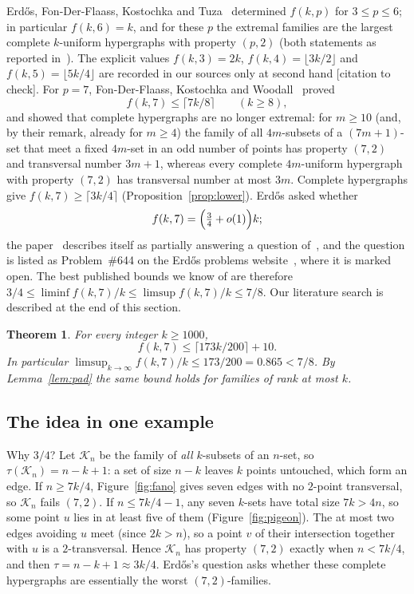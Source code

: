 \documentclass[11pt]{amsart}
\newtheorem{theorem}{Theorem}[section]
\theoremstyle{definition}
\theoremstyle{remark}
\newcommand{\ceil}[1]{\lceil #1\rceil}
\newcommand{\floor}[1]{\lfloor #1\rfloor}
\begin{document}
Erd\H{o}s, Fon-Der-Flaass, Kostochka and Tuza~\cite{EFKT} determined $f(k,p)$ for $3\le p\le6$; in particular $f(k,6)=k$, and for these $p$ the extremal families are the largest complete $k$-uniform hypergraphs with property $(p,2)$ (both statements as reported in~\cite{FKW}). The explicit values $f(k,3)=2k$, $f(k,4)=\floor{3k/2}$ and $f(k,5)=\floor{5k/4}$ are recorded in our sources only at second hand [citation to check]. For $p=7$, Fon-Der-Flaass, Kostochka and Woodall~\cite{FKW} proved
\[
f(k,7)\le\ceil{7k/8}\qquad(k\ge8),
\]
and showed that complete hypergraphs are no longer extremal: for $m\ge10$ (and, by their remark, already for $m\ge4$) the family of all $4m$-subsets of a $(7m+1)$-set that meet a fixed $4m$-set in an odd number of points has property $(7,2)$ and transversal number $3m+1$, whereas every complete $4m$-uniform hypergraph with property $(7,2)$ has transversal number at most $3m$. Complete hypergraphs give $f(k,7)\ge\ceil{3k/4}$ (Proposition~\ref{prop:lower}). Erd\H{o}s asked whether
\[
f(k,7)=\Bigl(\tfrac34+o(1)\Bigr)k ;
\]
the paper~\cite{FKW} describes itself as partially answering a question of~\cite{EFKT}, and the question is listed as Problem~\#644 on the Erd\H{o}s problems website~\cite{EP}, where it is marked open. The best published bounds we know of are therefore $3/4\le\liminf f(k,7)/k\le\limsup f(k,7)/k\le7/8$. Our literature search is described at the end of this section.

\begin{theorem}\label{thm:main}
For every integer $k\ge1000$,
\[
f(k,7)\le\ceil{173k/200}+10 .
\]
In particular $\limsup_{k\to\infty}f(k,7)/k\le173/200=0.865<7/8$. By Lemma~\ref{lem:pad} the same bound holds for families of rank at most $k$.
\end{theorem}

\subsection*{The idea in one example}
Why $3/4$? Let $\mathcal K_n$ be the family of \emph{all} $k$-subsets of an $n$-set, so $\tau(\mathcal K_n)=n-k+1$: a set of size $n-k$ leaves $k$ points untouched, which form an edge. If $n\ge7k/4$, Figure~\ref{fig:fano} gives seven edges with no $2$-point transversal, so $\mathcal K_n$ fails $(7,2)$. If $n\le 7k/4-1$, any seven $k$-sets have total size $7k>4n$, so some point $u$ lies in at least five of them (Figure~\ref{fig:pigeon}). The at most two edges avoiding $u$ meet (since $2k>n$), so a point $v$ of their intersection together with $u$ is a $2$-transversal. Hence $\mathcal K_n$ has property $(7,2)$ exactly when $n<7k/4$, and then $\tau=n-k+1\approx3k/4$. Erd\H{o}s's question asks whether these complete hypergraphs are essentially the worst $(7,2)$-families.
\end{document}
